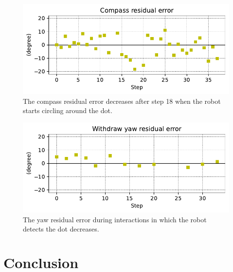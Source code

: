 \documentclass[runningheads]{llncs}
\begin{document}
\begin{figure}
	\includegraphics[width=\textwidth]{04_Compass.pdf}
	\caption{The compass residual error decreases after step 18 when the robot starts circling around the dot.} \label{fig:compass}
\end{figure}


\begin{figure}
	\includegraphics[width=\textwidth]{03_yaw_re.pdf}
	\caption{The yaw residual error during interactions in which the robot detects the dot decreases.} \label{fig:yaw_re}
\end{figure}

\section{Conclusion}
\end{document}
